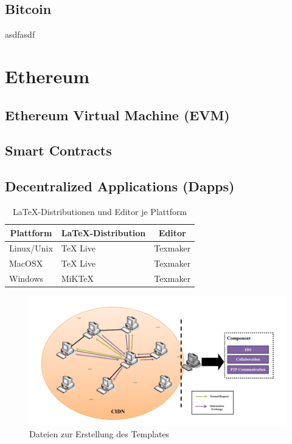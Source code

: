 \documentclass[11pt,a4paper]{report}
\begin{document}
\subsection{Bitcoin}
asdfasdf~\cite{bitcoin}

\section{Ethereum}
\subsection{Ethereum Virtual Machine (EVM)}
\subsection{Smart Contracts}
\subsection{Decentralized Applications (Dapps)}

\begin{table}
\centering
\begin{tabular}{|l||l|l|}
\hline
\multicolumn{1}{|c|}{\textbf{Plattform}} & 
\multicolumn{1}{|c|}{\textbf{\LaTeX-Distribution}} & 
\multicolumn{1}{|c|}{\textbf{Editor}} \\\hline\hline
Linux/Unix & TeX Live & Texmaker \\\hline
MacOSX     & TeX Live & Texmaker \\\hline
Windows    & MiKTeX   & Texmaker \\\hline   
\end{tabular}
\caption{\LaTeX-Distributionen und Editor je Plattform}
\label{tab:disteditplattform}
\end{table}





\begin{figure}[htp]
\centering
\includegraphics[width=.9\textwidth]{images/cids}
\caption{Dateien zur Erstellung des Templates}
\label{fig:templateprozess}
\end{figure}
\end{document}

